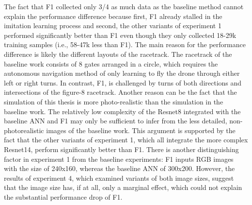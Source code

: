 The fact that F1 collected only 3/4 as much data as the baseline method
cannot explain the performance difference
because first,
F1 already stalled in the imitation learning process
and second, the other variants of experiment 1 
performed significantly better than F1 
even though they only collected 18-29k training samples  (i.e., 58-47k less than F1).
The main reason for the performance difference 
is likely the different layouts of the racetrack.
The racetrack of the baseline work consists of 8 gates arranged in a circle,
which requires the autonomous navigation method of only learning to fly the drone 
through either left or right turns.
In contrast, F1, is challenged by turns of both directions and intersections of the figure-8 racetrack.
Another reason can be the fact that the
simulation of this thesis is more photo-realistic than the simulation in the baseline work.
The relatively low complexity of the Resnet8 integrated with the baseline ANN and F1 
may only be sufficient to infer from the less detailed, non-photorealistic images of the baseline work.
This argument is supported by the fact that 
the other variants of experiment 1, which all integrate the more complex Resnet14,
perform significantly better than F1.
There is another distinguishing factor in experiment 1 from the baseline experiments:
F1 inputs RGB images with the size of 240x160, whereas the baseline ANN of 300x200.
However, the results of experiment 4, which examined variants of both image sizes, 
suggest that the image size has, if at all, only a marginal effect,
which could not explain the substantial performance drop of F1.

